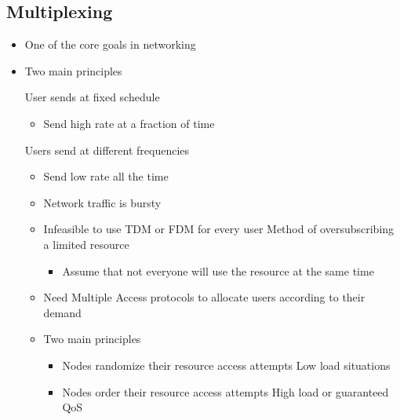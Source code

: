 \subsection{Multiplexing}
\begin{itemize}
     Share a limited resource
    \item One of the core goals in networking
    \item Two main principles
        \begin{itemize}
             User sends at fixed schedule
                \begin{itemize}
                    \item Send high rate at a fraction of time
                \end{itemize}
             Users send at different frequencies
                \begin{itemize}
                    \item Send low rate all the  time
                \end{itemize}
        \end{itemize}
        \begin{itemize}
            \item Network traffic is bursty
            \item Infeasible to use TDM or FDM for every user
             Method of oversubscribing a limited resource
                \begin{itemize}
                    \item Assume that not everyone will use the resource at the same time
                \end{itemize}
            \item Need Multiple Access protocols to allocate users according to their demand
            \item Two main principles
                \begin{itemize}
                        \begin{itemize}
                            \item Nodes randomize their resource access attempts
                            \ipro Low load situations
                        \end{itemize}
                        \begin{itemize}
                            \item Nodes order their resource access attempts
                            \ipro High load or guaranteed QoS
                        \end{itemize}
                \end{itemize}
        \end{itemize}
\end{itemize}

